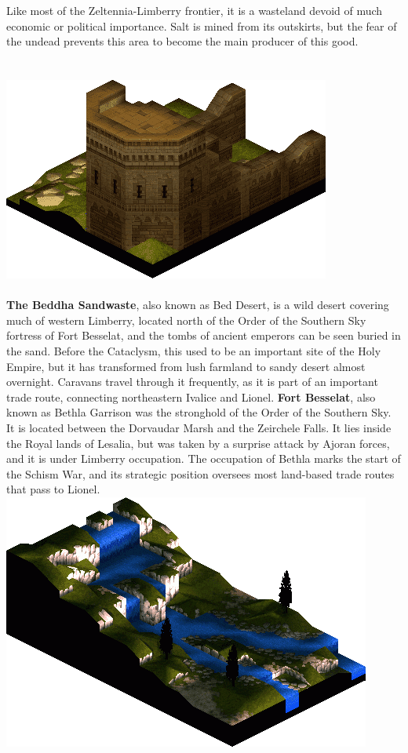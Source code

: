 Like most of the Zeltennia-Limberry frontier, it is a wasteland devoid of much economic or political importance. 
Salt is mined from its outskirts, but the fear of the undead prevents this area to become the main producer of this good.
%
\\\\\\
\includegraphics[width=\columnwidth]{./art/images/bethla.png}
\\\\
%
\textbf{The Beddha Sandwaste}, also known as Bed Desert, is a wild desert covering much of western Limberry, located north of the Order of the Southern Sky fortress of Fort Besselat, and the tombs of ancient emperors can be seen buried in the sand. 
Before the Cataclysm, this used to be an important site of the Holy Empire, but it has transformed from lush farmland to sandy desert almost overnight. 
Caravans travel through it frequently, as it is part of an important trade route, connecting northeastern Ivalice and Lionel.
\textbf{Fort Besselat}, also known as Bethla Garrison was the stronghold of the Order of the Southern Sky.
It is located between the Dorvaudar Marsh and the Zeirchele Falls. 
It lies inside the Royal lands of Lesalia, but was taken by a surprise attack by Ajoran forces, and it is under Limberry occupation.
The occupation of Bethla marks the start of the Schism War, and its strategic position oversees most land-based trade routes that pass to Lionel.
%
\vfill
\includegraphics[width=\columnwidth]{./art/images/finath.png}
